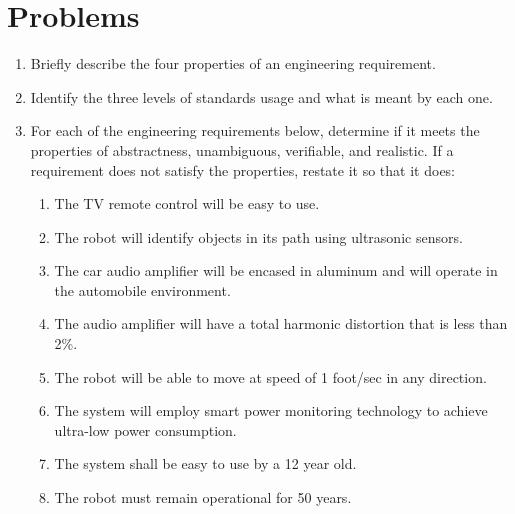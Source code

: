 \section{Problems}
\label{section:problems}

\begin{enumerate}
\def\labelenumi{\arabic{enumi}.}
\item
  Briefly describe the four properties of an engineering requirement.
\item
  Identify the three levels of standards usage and what is meant by each
  one.
\item
  For each of the engineering requirements below, determine if it meets
  the properties of abstractness, unambiguous, verifiable, and
  realistic. If a requirement does not satisfy the properties, restate
  it so that it does:


\begin{enumerate}
\def\labelenumi{\alph{enumi})}
\item
  The TV remote control will be easy to use.
\item
  The robot will identify objects in its path using ultrasonic sensors.
\item
  The car audio amplifier will be encased in aluminum and will operate
  in the automobile environment.
\item
  The audio amplifier will have a total harmonic distortion that is less
  than 2\%.
\item
  The robot will be able to move at speed of 1 foot/sec in any
  direction.
\item
  The system will employ smart power monitoring technology to achieve
  ultra-low power consumption.
\item
  The system shall be easy to use by a 12 year old.
\item
  The robot must remain operational for 50 years.
\end{enumerate}


\end{enumerate}
